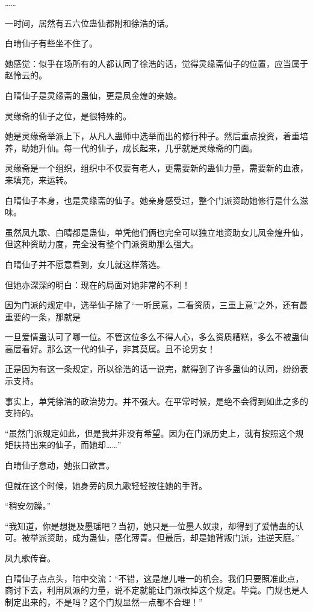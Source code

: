 \begin{this_body}
……

一时间，居然有五六位蛊仙都附和徐浩的话。

白晴仙子有些坐不住了。

她感觉：似乎在场所有的人都认同了徐浩的话，觉得灵缘斋仙子的位置，应当属于赵怜云的。

白晴仙子是灵缘斋的蛊仙，更是凤金煌的亲娘。

灵缘斋的仙子之位，是很特殊的。

她是灵缘斋举派上下，从凡人蛊师中选举而出的修行种子。然后重点投资，着重培养，助她升仙。每一代的仙子，成长起来，几乎就是灵缘斋的门面。

灵缘斋是一个组织，组织中不仅要有老人，更需要新的蛊仙力量，需要新的血液，来填充，来运转。

白晴仙子本身，也是灵缘斋的仙子。她亲身感受过，整个门派资助她修行是什么滋味。

虽然凤九歌、白晴都是蛊仙，单凭他们俩也完全可以独立地资助女儿凤金煌升仙，但这种资助力度，完全没有整个门派资助那么强大。

白晴仙子并不愿意看到，女儿就这样落选。

但她亦深深的明白：现在的局面对她非常的不利！

因为门派的规定中，选举仙子除了“一听民意，二看资质，三重上意”之外，还有最重要的一条，那就是

一旦爱情蛊认可了哪一位。不管这位多么不得人心，多么资质糟糕，多么不被蛊仙高层看好。那么这一代的仙子，非其莫属。且不论男女！

正是因为有这一条规定，所以徐浩的话一说完，就得到了许多蛊仙的认同，纷纷表示支持。

事实上，单凭徐浩的政治势力。并不强大。在平常时候，是绝不会得到如此之多的支持的。

“虽然门派规定如此，但是我并非没有希望。因为在门派历史上，就有按照这个规矩扶持出来的仙子，而她却……”

白晴仙子意动，她张口欲言。

但就在这个时候，她身旁的凤九歌轻轻按住她的手背。

“稍安勿躁。”

“我知道，你是想提及墨瑶吧？当初，她只是一位墨人奴隶，却得到了爱情蛊的认可。被举派资助，成为蛊仙，感化薄青。但最后，却是她背叛门派，违逆天庭。”

凤九歌传音。

白晴仙子点点头，暗中交流：“不错，这是煌儿唯一的机会。我们只要照准此点，商讨下去，利用凤派的力量，说不定就能让门派改掉这个规定。毕竟。门规也是人制定出来的，不是吗？这个门规显然一点都不合理！”


\end{this_body}
